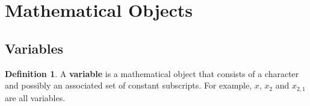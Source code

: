 \documentclass[]{article}
\theoremstyle{definition}
\newtheorem{definition}{Definition}[section]
\begin{document}
	
	\section{Mathematical Objects}
	
	\subsection{Variables}
	\begin{definition}
		A \textbf{variable} is a mathematical object that consists of a character
		and possibly an associated set of constant subscripts. For example, $x$, $x_2$ and $x_{2,1}$ are all variables.\\\\
	\end{definition}

	
\end{document}
